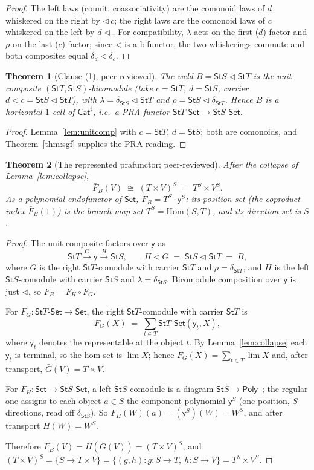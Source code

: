 \documentclass[11pt]{article}
\newcommand{\comp}{\mathbin{\triangleleft}}       %
\newcommand{\Set}{\mathsf{Set}}
\newcommand{\Poly}{\mathsf{Poly}}
\newcommand{\Cat}{\mathsf{Cat}^{\sharp}}
\newcommand{\St}{\mathsf{St}}                      %
\newcommand{\Hom}{\mathrm{Hom}}
\newcommand{\y}{\mathsf{y}}
\theoremstyle{plain}
\newtheorem{theorem}{Theorem}
\theoremstyle{definition}
\theoremstyle{remark}
\begin{document}
\begin{proof}
The left laws (counit, coassociativity) are the comonoid laws of $d$ whiskered on the right
by $\comp\,c$; the right laws are the comonoid laws of $c$ whiskered on the left by
$d\comp$. For compatibility, $\lambda$ acts on the first ($d$) factor and $\rho$ on the last
($c$) factor; since $\comp$ is a bifunctor, the two whiskerings commute and both composites
equal $\delta_d\comp\delta_c$.
\end{proof}

\begin{theorem}[Clause (1), peer-reviewed]\label{thm:weld}
The weld $B=\St S\comp\St T$ is the unit-composite $(\St T,\St S)$-bicomodule (take
$c=\St T$, $d=\St S$, carrier $d\comp c=\St S\comp\St T$), with $\lambda=\delta_{\St
S}\comp\St T$ and $\rho=\St S\comp\delta_{\St T}$. Hence $B$ is a horizontal $1$-cell of
$\Cat$, i.e.\ a PRA functor $\St T\text{-}\Set\to\St S\text{-}\Set$.
\end{theorem}

\begin{proof}
Lemma~\ref{lem:unitcomp} with $c=\St T$, $d=\St S$; both are comonoids, and
Theorem~\ref{thm:sgf} supplies the PRA reading.
\end{proof}

\begin{theorem}[The represented prafunctor; peer-reviewed]\label{thm:prafun}
After the collapse of Lemma~\ref{lem:collapse},
\[
  \bar F_B(V)\;\cong\;(T\times V)^S\;=\;T^S\times V^S .
\]
As a polynomial endofunctor of $\Set$, $\bar F_B=T^S\cdot\y^S$: its position set (the
coproduct index $\bar F_B(1)$) is the branch-map set $T^S=\Hom(S,T)$, and its direction set
is $S$.
\end{theorem}

\begin{proof}
The unit-composite factors over $\y$ as
\[
   \St T \xrightarrow{\ G\ } \y \xrightarrow{\ H\ } \St S,
   \qquad H\comp G \;=\; \St S\comp\St T \;=\; B,
\]
where $G$ is the right $\St T$-comodule with carrier $\St T$ and $\rho=\delta_{\St T}$, and
$H$ is the left $\St S$-comodule with carrier $\St S$ and $\lambda=\delta_{\St S}$.
Bicomodule composition over $\y$ is just $\comp$, so $F_B=F_H\circ F_G$.

For $F_G\colon\St T\text{-}\Set\to\Set$, the right $\St T$-comodule with carrier $\St T$ is
\[
   F_G(X)\;=\;\sum_{t\in T}\St T\text{-}\Set(\y_t,X),
\]
where $\y_t$ denotes the representable at the object $t$. By Lemma~\ref{lem:collapse} each
$\y_t$ is terminal, so the hom-set is $\lim X$; hence $F_G(X)=\sum_{t\in T}\lim X$ and,
after transport, $\bar G(V)=T\times V$.

For $F_H\colon\Set\to\St S\text{-}\Set$, a left $\St S$-comodule is a diagram
$\St S\to\Poly$~\cite[Prop.~5.7]{SGF}; the regular one assigns to each object $a\in S$ the
component polynomial $\y^S$ (one position, $S$ directions, read off $\delta_{\St S}$). So
$F_H(W)(a)=(\y^S)(W)=W^S$, and after transport $\bar H(W)=W^S$.

Therefore $\bar F_B(V)=\bar H(\bar G(V))=(T\times V)^S$, and $(T\times V)^S=\{S\to T\times
V\}=\{(g,h):g\colon S\to T,\ h\colon S\to V\}=T^S\times V^S$.
\end{proof}
\end{document}
